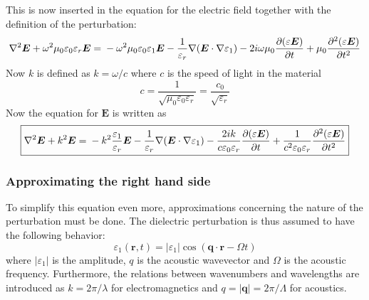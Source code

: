 \documentclass[10pt,a4paper,draft]{scrartcl}
\begin{document}
	This is now inserted in the equation for the electric field together with the definition of the perturbation:
	\begin{equation*}
		\nabla^2\bm{E} + \omega^2 \mu_0 \varepsilon_0 \varepsilon_r \bm{E} = \\
		 -\omega^2 \mu_0 \varepsilon_0 \varepsilon_1 \bm{E} -\frac{1}{\varepsilon_r}\nabla(\bm{E} \cdot \nabla \varepsilon_1) - 2i\omega \mu_0 \frac{\partial (\varepsilon \bm{E})}{\partial t} + \mu_0 \frac{\partial^2 (\varepsilon \bm{E})}{\partial t^2}
	\end{equation*}
	Now $k$ is defined as $k = \omega/c$ where $c$ is the speed of light in the material
	\begin{equation*}
		c = \frac{1}{\sqrt{\mu_0 \varepsilon_0 \varepsilon_r}} = \frac{c_0}{\sqrt{\varepsilon_r}}
	\end{equation*}
	Now the equation for $\bm{E}$ is written as
	\begin{equation*}
	\boxed{
		\nabla^2\bm{E} + k^2 \bm{E} = \\
		-k^2 \frac{\varepsilon_1}{\varepsilon_r} \bm{E} -\frac{1}{\varepsilon_r}\nabla(\bm{E} \cdot \nabla \varepsilon_1) - \frac{2ik}{c\varepsilon_0\varepsilon_r} \frac{\partial (\varepsilon \bm{E})}{\partial t} + \frac{1}{c^2 \varepsilon_0 \varepsilon_r} \frac{\partial^2 (\varepsilon \bm{E})}{\partial t^2}
	}
	\end{equation*}
	
	\subsubsection{Approximating the right hand side}
	To simplify this equation even more, approximations concerning the nature of the perturbation must be done. The dielectric perturbation is thus assumed to have the following behavior:
	\begin{equation*}
		\varepsilon_1 (\bm{r},t) = |\varepsilon_1| \cos(\bm{q} \cdot \bm{r} - \Omega t)
	\end{equation*}
	where $|\varepsilon_1|$ is the amplitude, $q$ is the acoustic wavevector and $\Omega$ is the acoustic frequency. Furthermore, the relations between wavenumbers and wavelengths are introduced as $k = 2\pi/\lambda$ for electromagnetics and $q = |\bm{q}| = 2\pi/\Lambda$ for acoustics.
	
\end{document}
